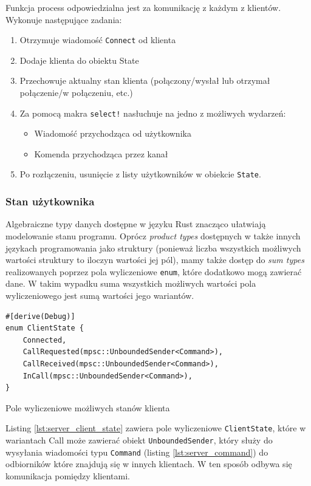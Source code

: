 Funkcja process odpowiedzialna jest za komunikację z każdym z klientów. Wykonuje następujące
zadania:

\begin{enumerate}
    \item Otrzymuje wiadomość \verb|Connect| od klienta
    \item Dodaje klienta do obiektu State
    \item Przechowuje aktualny stan klienta (połączony/wysłał lub otrzymał połączenie/w połączeniu,
          etc.)
    \item Za pomocą makra \verb|select!| nasłuchuje na jedno z możliwych wydarzeń:
          \begin{itemize}
              \item Wiadomość przychodząca od użytkownika
              \item Komenda przychodząca przez kanał
          \end{itemize}
    \item Po rozłączeniu, usunięcie z listy użytkowników w obiekcie \verb|State|.
\end{enumerate}

\subsubsection{Stan użytkownika}

Algebraiczne typy danych dostępne w języku Rust znacząco ułatwiają modelowanie stanu programu.
Oprócz \emph{product types} dostępnych w także innych językach programowania jako struktury
(ponieważ liczba wszystkich możliwych wartości struktury to iloczyn wartości jej pól), mamy także
dostęp do \emph{sum types} realizowanych poprzez pola wyliczeniowe \verb|enum|, które dodatkowo mogą
zawierać dane. W takim wypadku suma wszystkich możliwych wartości pola wyliczeniowego jest sumą
wartości jego wariantów.

\begin{listing}[H]
    \begin{verbatim}
#[derive(Debug)]
enum ClientState {
    Connected,
    CallRequested(mpsc::UnboundedSender<Command>),
    CallReceived(mpsc::UnboundedSender<Command>),
    InCall(mpsc::UnboundedSender<Command>),
}
    \end{verbatim}
    \caption{Pole wyliczeniowe możliwych stanów klienta}
    \label{lst:server_client_state}
\end{listing}

Listing \ref{lst:server_client_state} zawiera pole wyliczeniowe \verb|ClientState|, które w
wariantach Call może zawierać obiekt \verb|UnboundedSender|, który służy do wysyłania wiadomości
typu \verb|Command| (listing \ref{lst:server_command}) do odbiorników które znajdują się w innych
klientach. W ten sposób odbywa się komunikacja pomiędzy klientami.


